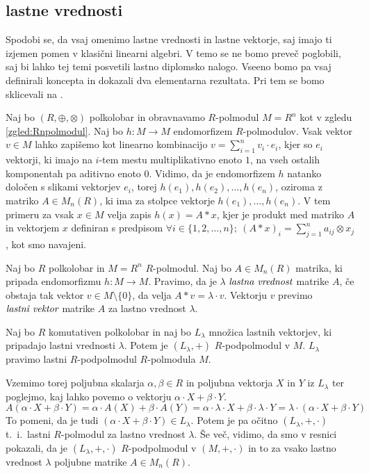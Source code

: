 \documentclass[mat1]{fmfdelo}
\newcommand{\pojem}[1]{\ensuremath{\emph{#1}}}
\newcommand{\map}[3]{\ensuremath{{#1}:{#2}\rightarrow{#3}}}
\begin{document}
\subsection{lastne vrednosti}
Spodobi se, da vsaj omenimo lastne vrednosti in lastne vektorje, saj imajo ti izjemen pomen v klasični linearni algebri. V temo se ne bomo preveč poglobili, saj bi lahko tej temi posvetili lastno diplomsko nalogo. Vseeno bomo pa vsaj definirali koncepta in dokazali dva elementarna rezultata. Pri tem se bomo sklicevali na \cite[poglavje 6]{bib:Gondran}.

Naj bo $(R, \oplus, \otimes)$ polkolobar in obravnavamo $R$-polmodul $M = R^n$ kot v zgledu \ref{zgled:Rnpolmodul}. Naj bo $\map{h}{M}{M}$ endomorfizem $R$-polmodulov. Vsak vektor $v\in M$ lahko zapišemo kot linearno kombinacijo $v = \sum_{i = 1}^{n}v_i\cdot e_i$, kjer so $e_i$ vektorji, ki imajo na $i$-tem mestu multiplikativno enoto $1$, na vseh ostalih komponentah pa aditivno enoto $0$. Vidimo, da je endomorfizem $h$ natanko določen s slikami vektorjev $e_i$, torej $h(e_1), h(e_2), \ldots, h(e_n)$, oziroma z matriko $A\in M_n(R)$, ki ima za stolpce vektorje $h(e_1), \ldots, h(e_n)$. V tem primeru za vsak $x\in M$ velja zapis $h(x) = A*x$, kjer je produkt med matriko $A$ in vektorjem $x$ definiran s predpisom $\forall i\in \{1, 2, \ldots, n\};~(A*x)_i = \sum_{j = 1}^{n} a_{ij}\otimes x_j$, kot smo navajeni.

\begin{definicija}
	Naj bo $R$ polkolobar in $M = R^n$ $R$-polmodul. Naj bo $A\in M_n(R)$ matrika, ki pripada endomorfizmu $\map{h}{M}{M}$. Pravimo, da je $\lambda$ \pojem{lastna vrednost} matrike $A$, če obstaja tak vektor $v\in M\setminus\{0\}$, da velja $A * v = \lambda \cdot v$. Vektorju $v$ previmo \pojem{lastni vektor} matrike $A$ za lastno vrednost $\lambda$.
\end{definicija}


\begin{trditev}
Naj bo $R$ komutativen polkolobar in naj bo $L_\lambda$ množica lastnih vektorjev, ki pripadajo lastni vrednosti $\lambda$. Potem je $(L_\lambda, +)$ $R$-podpolmodul v $M$. $L_\lambda$ pravimo lastni $R$-podpolmodul $R$-polmodula $M$.
\end{trditev}

\begin{dokaz}
Vzemimo torej poljubna skalarja $\alpha, \beta\in R$ in poljubna vektorja $X$ in $Y$ iz $L_\lambda$ ter poglejmo, kaj lahko povemo o vektorju $\alpha\cdot X + \beta\cdot Y$. $$A(\alpha\cdot X + \beta\cdot Y) = \alpha\cdot A(X) + \beta\cdot A(Y) = \alpha\cdot\lambda\cdot X + \beta\cdot\lambda\cdot Y = \lambda\cdot (\alpha\cdot X + \beta\cdot Y)$$ To pomeni, da je tudi $(\alpha\cdot X + \beta\cdot Y)\in L_\lambda$. Potem je pa očitno $(L_\lambda, +, \cdot)$ t.~i.~lastni $R$-polmodul za lastno vrednost $\lambda$. Še več, vidimo, da smo v resnici pokazali, da je $(L_\lambda, +, \cdot)$ $R$-podpolmodul v $(M, +, \cdot)$ in to za vsako lastno vrednost $\lambda$ poljubne matrike $A\in M_n(R)$.
\end{dokaz}
\end{document}
